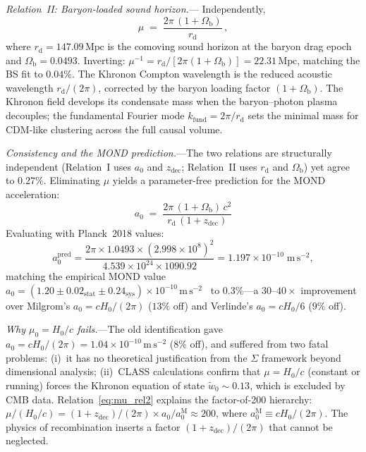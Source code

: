 \documentclass[prd,twocolumn,superscriptaddress,longbibliography,floatfix]{revtex4-2}
\begin{document}
\emph{Relation~II: Baryon-loaded sound horizon.}---%
Independently,
\begin{equation}
\mu \;=\; \frac{2\pi\,(1 + \Omega_{\mathrm{b}})}
{r_{\mathrm{d}}} \,,
\label{eq:mu_rel2}
\end{equation}
where $r_{\mathrm{d}} = 147.09\,\mathrm{Mpc}$ is the
comoving sound horizon at the baryon drag
epoch~\cite{Planck2018} and
$\Omega_{\mathrm{b}} = 0.0493$.
Inverting:
$\mu^{-1} = r_{\mathrm{d}}/[2\pi(1+\Omega_{\mathrm{b}})]
= 22.31\,\mathrm{Mpc}$, matching the BS fit to
$0.04\%$.
The Khronon Compton wavelength is the reduced acoustic
wavelength $r_{\mathrm{d}}/(2\pi)$, corrected by the
baryon loading factor $(1+\Omega_{\mathrm{b}})$.
The Khronon field develops its condensate mass when
the baryon--photon plasma decouples; the fundamental
Fourier mode $k_{\mathrm{fund}} = 2\pi/r_{\mathrm{d}}$
sets the minimal mass for CDM-like clustering across
the full causal volume.

\emph{Consistency and the MOND prediction.}---The two
relations are structurally independent (Relation~I
uses $a_0$ and $z_{\mathrm{dec}}$; Relation~II
uses $r_{\mathrm{d}}$ and $\Omega_{\mathrm{b}}$)
yet agree to $0.27\%$.
Eliminating $\mu$ yields a parameter-free prediction
for the MOND acceleration:
\begin{equation}
\boxed{\;
a_0 \;=\; \frac{2\pi\,(1+\Omega_{\mathrm{b}})\,c^2}
{r_{\mathrm{d}}\,(1+z_{\mathrm{dec}})} \;}
\label{eq:a0_pred}
\end{equation}
Evaluating with Planck~2018 values:
\begin{equation}
a_0^{\mathrm{pred}}
= \frac{2\pi \times 1.0493 \times
        (2.998 \times 10^8)^2}
       {4.539 \times 10^{24} \times 1090.92}
= 1.197 \times 10^{-10}\;\mathrm{m\,s}^{-2},
\label{eq:a0_numerical}
\end{equation}
matching the empirical MOND value
$a_0 = (1.20 \pm 0.02_{\mathrm{stat}}
\pm 0.24_{\mathrm{sys}}) \times 10^{-10}\,
\mathrm{m\,s}^{-2}$~\cite{McGaugh2016,Lelli2017}
to $0.3\%$---a $30$--$40\times$ improvement over
Milgrom's $a_0 = cH_0/(2\pi)$ ($13\%$ off) and
Verlinde's $a_0 = cH_0/6$ ($9\%$ off).

\emph{Why $\mu_0 = H_0/c$ fails.}---The old
identification gave $a_0 = cH_0/(2\pi)
= 1.04 \times 10^{-10}\,\mathrm{m\,s}^{-2}$
(8\% off), and suffered from two fatal problems:
(i)~it has no theoretical justification from the
$\Sigma$ framework beyond dimensional analysis;
(ii)~CLASS calculations confirm that $\mu = H_0/c$
(constant or running) forces the Khronon equation of
state $\tilde{w}_0 \sim 0.13$, which is excluded by
CMB data.
Relation~\eqref{eq:mu_rel2} explains the factor-of-200
hierarchy: $\mu/(H_0/c) = (1+z_{\mathrm{dec}})/(2\pi)
\times a_0/a_0^{\mathrm{M}} \approx 200$, where
$a_0^{\mathrm{M}} \equiv cH_0/(2\pi)$.
The physics of recombination inserts a factor
$(1+z_{\mathrm{dec}})/(2\pi)$ that cannot be
neglected.
\end{document}
